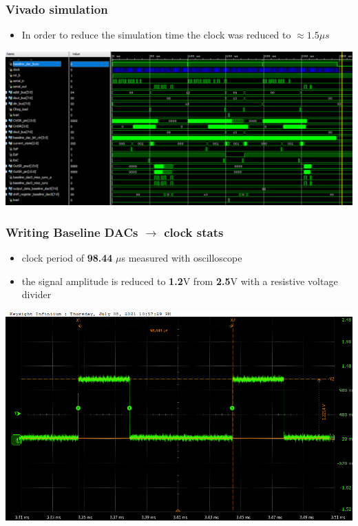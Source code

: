 \documentclass[aspectratio=169]{beamer}
\begin{document}
	\begin{frame}
	\frametitle{Vivado simulation}
	\begin{itemize}
		\item In order to reduce the simulation time the clock was reduced to $\approx1.5\mu s$
	\end{itemize}
		\begin{center}
			\includegraphics[width=0.85 \textwidth]{IMG/TotalSimulation.png}
		\end{center}
	\end{frame}

	\begin{frame}
	\frametitle{Writing Baseline DACs $\rightarrow$ clock stats}
	\begin{itemize}
		\item clock period of \textbf{98.44} $\mu$s measured with oscilloscope
		\item the signal amplitude is reduced to \textbf{1.2}V from \textbf{2.5}V with a resistive voltage divider 
	\end{itemize}
	\begin{center}
		\includegraphics[width=0.65 \textwidth]{IMG/probe/09-08-2021_clock-specks.png}
	\end{center}
	\end{frame}
\end{document}
